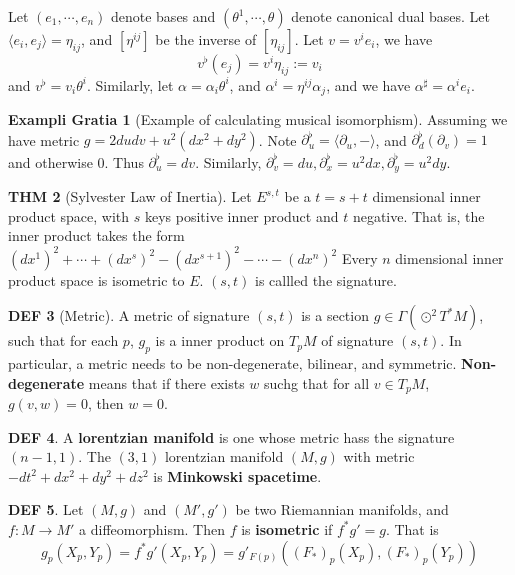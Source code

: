 \documentclass[twocolumn]{article}
\renewcommand{\emph}[1]{{\color{blue!70!black}\sffamily\bfseries #1}}
\newcommand{\p}{\partial}
\newcommand{\G}{\Gamma}
\theoremstyle{definition}
\newtheorem{thm}{THM}
\newtheorem{example}[thm]{Exampli Gratia}
\newtheorem{defi}[thm]{DEF}
\begin{document}
\begin{eg}{}{}
	Let $(e_1, \cdots, e_n)$ denote bases and $(\theta^1, \cdots, \theta)$ denote canonical dual bases. 
	Let $\langle e_i, e_j\rangle = \eta_{ij}$, and $[\eta^{ij}]$ be the inverse of $[\eta_{ij}]$.
	Let $v = v^ie_i$, we have 
	$$
	v^{\flat}(e_j) = v^i \eta_{ij} := v_i
	$$
	and $v^{\flat}= v_i \theta^{i}$.
	Similarly, let $\alpha = \alpha_i \theta^i$, and $\alpha^i = \eta^{ij}\alpha_j$, and we have $\alpha^{\sharp} = \alpha^i e_i$.
\end{eg}

\begin{example}[Example of calculating musical isomorphism]
	Assuming we have metric $g = 2du dv + u^2(dx^2 + dy^2)$.
	Note $\p_u ^{\flat} = \langle \p_u, - \rangle$, and $\p_d^{\flat}(\p_v) = 1$ and otherwise $0$. Thus $\p_u^{\flat} = dv$.
	Similarly, $\p_v^{\flat} = du, \p_x^{\flat} = u^2 dx, \p_y^{\flat} = u^2 dy$.
\end{example}

\begin{thm}[Sylvester Law of Inertia]
	Let $E^{s,t}$ be a $t = s+t$ dimensional inner product space, with $s$ keys positive inner product and $t$ negative. That is, the inner product takes the form $(dx^1)^2 + \cdots + (dx^s)^2 - (dx^{s+1})^2 - \cdots - (dx^n)^2$
	Every $n$ dimensional inner product space is isometric to $E$.
	$(s, t)$ is callled the signature.
\end{thm}

\begin{defi}[Metric]
	A metric of signature $(s,t)$ is a section $g \in \G(\odot ^2 T^*M)$, such that for each $p$, $g_p$ is a inner product on $T_pM$ of signature $(s, t)$.
	In particular, a metric needs to be non-degenerate, bilinear, and symmetric.
	\emph{Non-degenerate} means that if there exists $w$ suchg that for all $v \in T_pM$, $g(v, w) = 0$, then $w = 0$.
\end{defi}

\begin{defi}
	A \emph{lorentzian manifold} is one whose metric hass the signature $(n-1,1)$.
	The $(3,1)$ lorentzian manifold $(M, g)$ with metric $-dt^2 + dx^2 + dy^2 + dz^2$ is \emph{Minkowski spacetime}.
\end{defi}

\begin{defi}
	Let $(M, g)$ and $(M', g')$ be two Riemannian manifolds, and $f: M \rightarrow M'$ a diffeomorphism. 
	Then $f$ is \emph{isometric} if $f^*g' = g$.
	That is 
	$$
	g_p(X_p, Y_p) = f^*g'(X_p, Y_p) = g'_{F(p)}((F_*)_p(X_p), (F_*)_p(Y_p))
	$$
\end{defi}
\end{document}
